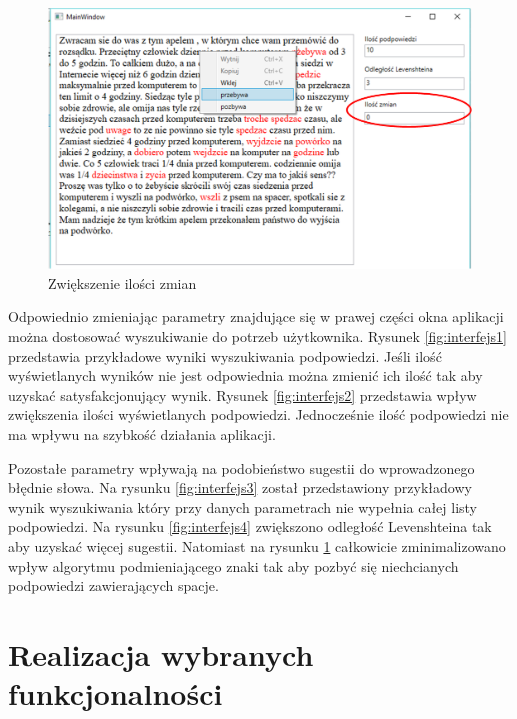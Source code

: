 \begin{figure} [H]
	\centering
	\includegraphics[width=1\linewidth]{rozdzial03/screen6_1.png}
	\caption{Zwiększenie ilości zmian}
	\label{fig:interfejs5}
\end{figure}

Odpowiednio zmieniając parametry znajdujące się w prawej części okna aplikacji można dostosować wyszukiwanie do potrzeb użytkownika. Rysunek \ref{fig:interfejs1} przedstawia przykładowe wyniki wyszukiwania podpowiedzi. Jeśli ilość wyświetlanych wyników nie jest odpowiednia można zmienić ich ilość tak aby uzyskać satysfakcjonujący wynik. Rysunek \ref{fig:interfejs2} przedstawia wpływ zwiększenia ilości wyświetlanych podpowiedzi. Jednocześnie ilość podpowiedzi nie ma wpływu na szybkość działania aplikacji. 

Pozostałe parametry wpływają na podobieństwo sugestii do wprowadzonego błędnie słowa. Na rysunku \ref{fig:interfejs3} został przedstawiony przykładowy wynik wyszukiwania który przy danych parametrach nie wypełnia całej listy podpowiedzi. Na rysunku \ref{fig:interfejs4} zwiększono odległość Levenshteina tak aby uzyskać więcej sugestii. Natomiast na rysunku \ref{fig:interfejs5} całkowicie zminimalizowano wpływ algorytmu podmieniającego znaki tak aby pozbyć się niechcianych podpowiedzi zawierających spacje.
 
\section{Realizacja wybranych funkcjonalności}

